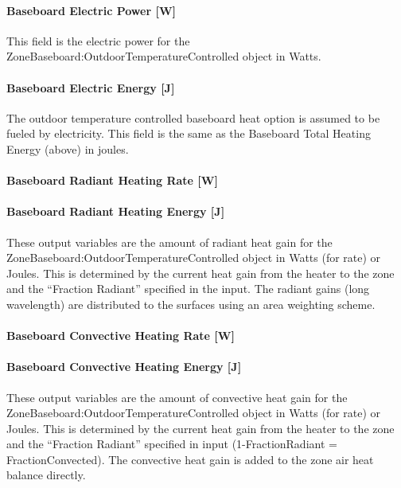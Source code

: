 \paragraph{Baseboard Electric Power {[}W{]}}\label{baseboard-electric-power-w}

This field is the electric power for the ZoneBaseboard:OutdoorTemperatureControlled object in Watts.

\paragraph{Baseboard Electric Energy {[}J{]}}\label{baseboard-electric-energy-j}

The outdoor temperature controlled baseboard heat option is assumed to be fueled by electricity. This field is the same as the Baseboard Total Heating Energy (above) in joules.

\paragraph{Baseboard Radiant Heating Rate {[}W{]}}\label{baseboard-radiant-heating-rate-w}

\paragraph{Baseboard Radiant Heating Energy {[}J{]}}\label{baseboard-radiant-heating-energy-j}

These output variables are the amount of radiant heat gain for the Zone\-Baseboard:\-Outdoor\-Temperature\-Controlled object in Watts (for rate) or Joules. This is determined by the current heat gain from the heater to the zone and the ``Fraction Radiant'' specified in the input. The radiant gains (long wavelength) are distributed to the surfaces using an area weighting scheme.

\paragraph{Baseboard Convective Heating Rate {[}W{]}}\label{baseboard-convective-heating-rate-w}

\paragraph{Baseboard Convective Heating Energy {[}J{]}}\label{baseboard-convective-heating-energy-j}

These output variables are the amount of convective heat gain for the Zone\-Baseboard:\-Outdoor\-Temperature\-Controlled object in Watts (for rate) or Joules. This is determined by the current heat gain from the heater to the zone and the ``Fraction Radiant'' specified in input (1-FractionRadiant = FractionConvected). The convective heat gain is added to the zone air heat balance directly.

